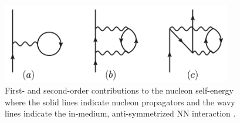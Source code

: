 \documentclass[preprintnumbers,floatfix,aps,prc,preprint,nofootinbib]{revtex4-1}
\begin{document}
%
\begin{figure}
	\captionsetup{singlelinecheck=false,justification=raggedright}
	\centering
	\includegraphics[width=10cm]{nucleon_self_energy}
	\caption{First- and second-order contributions to the nucleon self-energy where the solid lines indicate nucleon propagators and the wavy lines indicate the in-medium, anti-symmetrized NN interaction \cite{Whitehead:2018bfs}.}
	\label{fig:nucleon_self_energy}
\end{figure}
%
\end{document}
